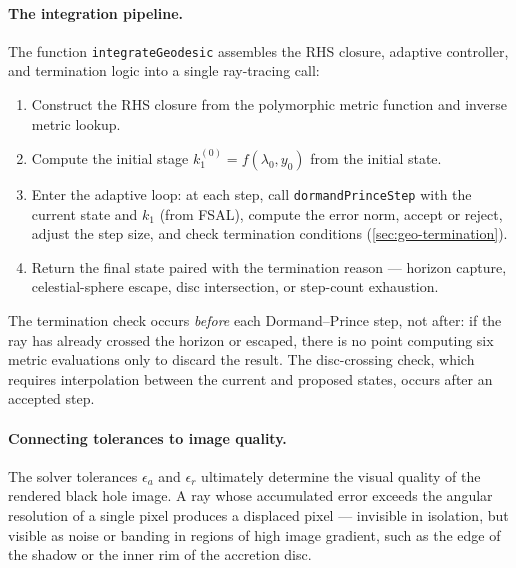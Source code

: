 \paragraph{The integration pipeline.}

The function \texttt{integrateGeodesic} assembles the RHS closure,
adaptive controller, and termination logic into a single ray-tracing
call:
%
\begin{enumerate}
\item Construct the RHS closure from the polymorphic metric function
  and inverse metric lookup.
\item Compute the initial stage $k_1^{(0)} = f(\lambda_0, y_0)$ from
  the initial state.
\item Enter the adaptive loop: at each step, call
  \texttt{dormandPrinceStep} with the current state and $k_1$
  (from FSAL), compute the error norm, accept or reject, adjust the
  step size, and check termination conditions
  (\cref{sec:geo-termination}).
\item Return the final state paired with the termination reason ---
  horizon capture, celestial-sphere escape, disc intersection, or
  step-count exhaustion.
\end{enumerate}
%
The termination check occurs \emph{before} each Dormand--Prince step,
not after: if the ray has already crossed the horizon or escaped,
there is no point computing six metric evaluations only to discard
the result.  The disc-crossing check, which requires interpolation
between the current and proposed states, occurs after an accepted
step.

\paragraph{Connecting tolerances to image quality.}

The solver tolerances $\epsilon_a$ and $\epsilon_r$ ultimately
determine the visual quality of the rendered black hole image.  A ray
whose accumulated error exceeds the angular resolution of a single
pixel produces a displaced pixel --- invisible in isolation, but
visible as noise or banding in regions of high image gradient, such as
the edge of the shadow or the inner rim of the accretion disc.

